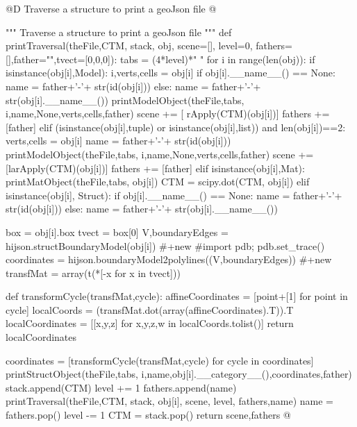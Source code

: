 \documentclass[11pt,oneside]{article}	%
\begin{document}
@D Traverse a structure to print a geoJson file
@{""" Traverse a structure to print a geoJson file """
def printTraversal(theFile,CTM, stack, obj, scene=[], level=0, fathers=[],father="",tvect=[0,0,0]):
   tabs = (4*level)*" "
   for i in range(len(obj)):
      if isinstance(obj[i],Model): 
         i,verts,cells = obj[i]
         if obj[i].__name__() == None:
            name = father+'-'+ str(id(obj[i]))
         else: 
            name = father+'-'+ str(obj[i].__name__())
         printModelObject(theFile,tabs, i,name,None,verts,cells,father)
         scene += [ rApply(CTM)(obj[i])]
         fathers += [father]
      elif (isinstance(obj[i],tuple) or isinstance(obj[i],list)) and len(obj[i])==2:
         verts,cells = obj[i]
         name = father+'-'+ str(id(obj[i]))
         printModelObject(theFile,tabs, i,name,None,verts,cells,father)
         scene += [larApply(CTM)(obj[i])]
         fathers += [father]
      elif isinstance(obj[i],Mat): 
         printMatObject(theFile,tabs, obj[i])
         CTM = scipy.dot(CTM,  obj[i])
      elif isinstance(obj[i], Struct):
         if obj[i].__name__() == None:
            name = father+'-'+ str(id(obj[i]))
         else: 
            name = father+'-'+ str(obj[i].__name__())
            
         box = obj[i].box
         tvect = box[0]
         V,boundaryEdges = hijson.structBoundaryModel(obj[i])   #+new
         #import pdb; pdb.set_trace()
         coordinates = hijson.boundaryModel2polylines((V,boundaryEdges))  #+new
         transfMat = array(t(*[-x for x in tvect]))
         
         def transformCycle(transfMat,cycle):
             affineCoordinates = [point+[1] for point in cycle]
             localCoords = (transfMat.dot(array(affineCoordinates).T)).T
             localCoordinates = [[x,y,z] for x,y,z,w in localCoords.tolist()]
             return localCoordinates
             
         coordinates = [transformCycle(transfMat,cycle) for cycle in coordinates]
         printStructObject(theFile,tabs, i,name,obj[i].__category__(),coordinates,father)
         stack.append(CTM) 
         level += 1
         fathers.append(name)
         printTraversal(theFile,CTM, stack, obj[i], scene, level, fathers,name)
         name = fathers.pop()
         level -= 1
         CTM = stack.pop()
   return scene,fathers
@}
\end{document}
